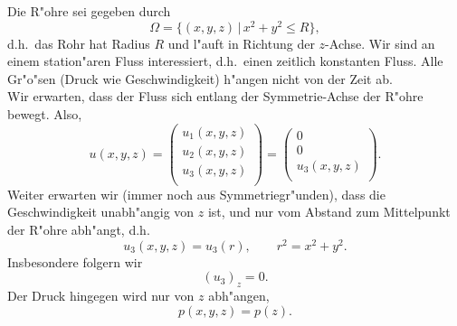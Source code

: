  Die R"ohre sei gegeben 
durch
$$\Omega = \{(x,y,z)\,|\, x^2+y^2\leq R\},$$
d.h.\ das Rohr hat Radius $R$ und l"auft in Richtung der $z$-Achse. 
Wir sind an einem station"aren Fluss interessiert, d.h.\ einen zeitlich konstanten 
Fluss. Alle Gr"o"sen (Druck wie Geschwindigkeit) h"angen nicht von der Zeit ab. \\
Wir erwarten, dass der Fluss sich entlang der Symmetrie-Achse der R"ohre bewegt. 
Also,
$$ u(x,y,z) = 
\left(\begin{array}{c}
u_1(x,y,z)\\u_2(x,y,z)\\u_3(x,y,z)\\
\end{array}\right)
= 
\left(\begin{array}{c}
0\\0\\u_3(x,y,z)\\
\end{array}\right).
$$
Weiter erwarten wir (immer noch aus Symmetriegr"unden), dass die Geschwindigkeit 
unabh"angig von $z$ ist, und nur vom Abstand zum Mittelpunkt
der R"ohre abh"angt, d.h.
$$ u_3(x,y,z) = u_3(r),\qquad r^2 = x^2+y^2.$$
Insbesondere folgern wir 
 $$(u_3)_z=0.$$
Der Druck hingegen wird nur von $z$ abh"angen,
$$ p(x,y,z) = p(z).$$

